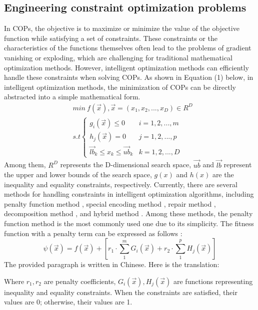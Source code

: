 \documentclass[preprint,review,compress,12pt]{elsarticle}
\begin{document}
\subsection{Engineering constraint optimization problems}
In COPs, the objective is to maximize or minimize the value of the objective function while satisfying a set of constraints. These constraints or the characteristics of the functions themselves often lead to the problems of gradient vanishing or exploding, which are challenging for traditional mathematical optimization methods. However, intelligent optimization methods can efficiently handle these constraints when solving COPs. As shown in Equation (1) below, in intelligent optimization methods, the minimization of COPs can be directly abstracted into a simple mathematical form.
\begin{equation}  \begin{split}  &min\ f(\vec{x}), \vec{x} = (x_1,x_2,...,x_D)\in R^D  \\&s.t\left\{\begin{matrix}  g_i(\vec{x})\le 0 & i=1,2,...,m\\  h_j(\vec{x})= 0 & j=1,2,...,p \\  \vec{lb}_k \le x_k\le \vec{ub}_k & k=1,2,...,D\end{matrix}\right.  \end{split}  \end{equation}
Among them, $R^D$ represents the D-dimensional search space, $\vec{ub}$ and $\vec{lb}$ represent the upper and lower bounds of the search space, $g(x)$ and $h(x)$ are the inequality and equality constraints, respectively. Currently, there are several methods for handling constraints in intelligent optimization algorithms, including penalty function method \cite{carroll1961created,fiacco1966extensions}, special encoding method \cite{davis1991handbook}, repair method \cite{liepins1991genetic}, decomposition method \cite{deb2000efficient}, and hybrid method \cite{tahk2000coevolutionary}. Among these methods, the penalty function method is the most commonly used one due to its simplicity. The fitness function with a penalty term can be expressed as follows
:
\begin{equation}
\psi (\vec{x}) = f(\vec{x})+\left [   r_1\cdot {\textstyle \sum_{1}^{m}G_i(\vec{x})} +  r_2\cdot{\textstyle \sum_{1}^{p}H_j(\vec{x})}  \right ] 
\end{equation}
The provided paragraph is written in Chinese. Here is the translation:

Where $r_1,r_2$ are penalty coefficients, $G_i(\vec{x}),H_j(\vec{x})$ are functions representing inequality and equality constraints. When the constraints are satisfied, their values are 0; otherwise, their values are 1.
\end{document}
